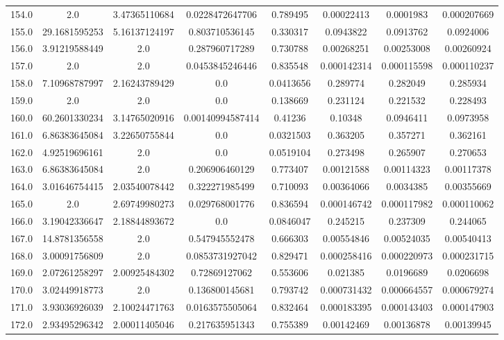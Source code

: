\begin{longtable}{|c|c|c|c|c|c|c|c|}
154.0 & 2.0 & 3.47365110684 & 0.0228472647706 & 0.789495 & 0.00022413 & 0.0001983 & 0.000207669 \\
155.0 & 29.1681595253 & 5.16137124197 & 0.803710536145 & 0.330317 & 0.0943822 & 0.0913762 & 0.0924006 \\
156.0 & 3.91219588449 & 2.0 & 0.287960717289 & 0.730788 & 0.00268251 & 0.00253008 & 0.00260924 \\
157.0 & 2.0 & 2.0 & 0.0453845246446 & 0.835548 & 0.000142314 & 0.000115598 & 0.000110237 \\
158.0 & 7.10968787997 & 2.16243789429 & 0.0 & 0.0413656 & 0.289774 & 0.282049 & 0.285934 \\
159.0 & 2.0 & 2.0 & 0.0 & 0.138669 & 0.231124 & 0.221532 & 0.228493 \\
160.0 & 60.2601330234 & 3.14765020916 & 0.00140994587414 & 0.41236 & 0.10348 & 0.0946411 & 0.0973958 \\
161.0 & 6.86383645084 & 3.22650755844 & 0.0 & 0.0321503 & 0.363205 & 0.357271 & 0.362161 \\
162.0 & 4.92519696161 & 2.0 & 0.0 & 0.0519104 & 0.273498 & 0.265907 & 0.270653 \\
163.0 & 6.86383645084 & 2.0 & 0.206906460129 & 0.773407 & 0.00121588 & 0.00114323 & 0.00117378 \\
164.0 & 3.01646754415 & 2.03540078442 & 0.322271985499 & 0.710093 & 0.00364066 & 0.0034385 & 0.00355669 \\
165.0 & 2.0 & 2.69749980273 & 0.029768001776 & 0.836594 & 0.000146742 & 0.000117982 & 0.000110062 \\
166.0 & 3.19042336647 & 2.18844893672 & 0.0 & 0.0846047 & 0.245215 & 0.237309 & 0.244065 \\
167.0 & 14.8781356558 & 2.0 & 0.547945552478 & 0.666303 & 0.00554846 & 0.00524035 & 0.00540413 \\
168.0 & 3.00091756809 & 2.0 & 0.0853731927042 & 0.829471 & 0.000258416 & 0.000220973 & 0.000231715 \\
169.0 & 2.07261258297 & 2.00925484302 & 0.72869127062 & 0.553606 & 0.021385 & 0.0196689 & 0.0206698 \\
170.0 & 3.02449918773 & 2.0 & 0.136800145681 & 0.793742 & 0.000731432 & 0.000664557 & 0.000679274 \\
171.0 & 3.93036926039 & 2.10024471763 & 0.0163575505064 & 0.832464 & 0.000183395 & 0.000143403 & 0.000147903 \\
172.0 & 2.93495296342 & 2.00011405046 & 0.217635951343 & 0.755389 & 0.00142469 & 0.00136878 & 0.00139945 \\

\end{longtable}
